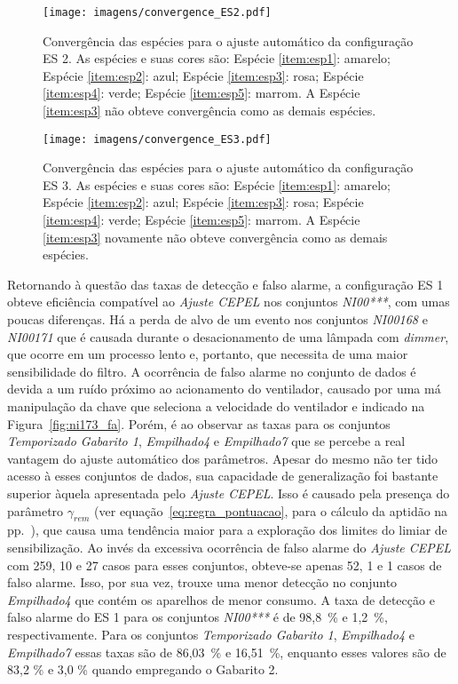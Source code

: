 \begin{figure}[!htb]
\centering
\texttt{[image: imagens/convergence\_ES2.pdf]}
\caption[Convergência das espécies para o ajuste automático da
configuração ES 2.]{Convergência das espécies para o ajuste automático da
configuração ES 2. As espécies e suas cores são: Espécie \ref{item:esp1}:
amarelo; Espécie \ref{item:esp2}: azul; Espécie \ref{item:esp3}: rosa;
Espécie \ref{item:esp4}: verde; Espécie \ref{item:esp5}: marrom. A
Espécie \ref{item:esp3} não obteve convergência como as demais
espécies.}
\label{fig:convergencia_es_2}
\end{figure}

\begin{figure}[!htb]
\centering
\texttt{[image: imagens/convergence\_ES3.pdf]}
\caption[Convergência das espécies para o ajuste automático da
configuração ES 3.]{Convergência das espécies para o ajuste automático da
configuração ES 3. As espécies e suas cores são: Espécie \ref{item:esp1}:
amarelo; Espécie \ref{item:esp2}: azul; Espécie \ref{item:esp3}: rosa;
Espécie \ref{item:esp4}: verde; Espécie \ref{item:esp5}: marrom. A
Espécie \ref{item:esp3} novamente não obteve convergência como as
demais espécies.}
\label{fig:convergencia_es_3}
\end{figure}

Retornando à questão das taxas de detecção e falso alarme, a
configuração ES 1 obteve eficiência compatível ao \emph{Ajuste CEPEL}
nos conjuntos \emph{NI00***}, com umas poucas diferenças. Há a perda
de alvo de um evento nos conjuntos \emph{NI00168} e \emph{NI00171} que
é causada durante o desacionamento de uma lâmpada com \emph{dimmer},
que ocorre em um processo lento e, portanto, que necessita de uma
maior sensibilidade do filtro. A ocorrência de falso alarme no
conjunto de dados é devida a um ruído próximo ao acionamento do
ventilador, causado por uma má manipulação da chave que seleciona a
velocidade do ventilador e indicado na Figura~\ref{fig:ni173_fa}.
Porém, é ao observar as taxas para os conjuntos \emph{Temporizado
Gabarito 1}, \emph{Empilhado4} e \emph{Empilhado7} que se percebe a
real vantagem do ajuste automático dos parâmetros. Apesar do mesmo não
ter tido acesso à esses conjuntos de dados, sua capacidade de
generalização foi bastante superior àquela apresentada pelo
\emph{Ajuste CEPEL}. Isso é causado pela presença do parâmetro
$\gamma_{rem}$ (ver equação~\ref{eq:regra_pontuacao}, para o cálculo
da aptidão na pp.~\pageref{eq:regra_pontuacao}), que causa uma
tendência maior para a exploração dos limites do limiar de
sensibilização. Ao invés da excessiva ocorrência de falso alarme do
\emph{Ajuste CEPEL} com 259, 10 e 27 casos para esses conjuntos,
obteve-se apenas 52, 1 e 1 casos de falso alarme.  Isso, por sua vez,
trouxe uma menor detecção no conjunto \emph{Empilhado4} que contém os
aparelhos de menor consumo. A taxa de detecção e falso alarme do ES 1
para os conjuntos \emph{NI00***} é de 98,8~\% e 1,2~\%,
respectivamente. Para os conjuntos \emph{Temporizado Gabarito 1},
\emph{Empilhado4} e \emph{Empilhado7} essas taxas são de 86,03~\% e
16,51~\%, enquanto esses valores são de 83,2 \% e 3,0 \% quando
empregando o Gabarito 2.

